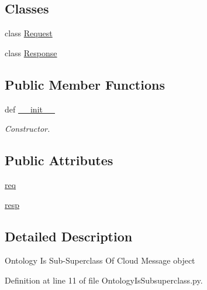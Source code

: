 \subsection*{Classes}
\begin{DoxyCompactItemize}
\item 
class \hyperlink{classRappCloud_1_1CloudMsgs_1_1OntologyIsSubsuperclass_1_1OntologyIsSubsuperclass_1_1Request}{Request}
\item 
class \hyperlink{classRappCloud_1_1CloudMsgs_1_1OntologyIsSubsuperclass_1_1OntologyIsSubsuperclass_1_1Response}{Response}
\end{DoxyCompactItemize}
\subsection*{Public Member Functions}
\begin{DoxyCompactItemize}
\item 
def \hyperlink{classRappCloud_1_1CloudMsgs_1_1OntologyIsSubsuperclass_1_1OntologyIsSubsuperclass_a8ce28cb561c85abac5df189f4b043601}{\-\_\-\-\_\-init\-\_\-\-\_\-}
\begin{DoxyCompactList}\small\item\em Constructor. \end{DoxyCompactList}\end{DoxyCompactItemize}
\subsection*{Public Attributes}
\begin{DoxyCompactItemize}
\item 
\hyperlink{classRappCloud_1_1CloudMsgs_1_1OntologyIsSubsuperclass_1_1OntologyIsSubsuperclass_a3ba977d885c6e4a0320e3f95450f883f}{req}
\item 
\hyperlink{classRappCloud_1_1CloudMsgs_1_1OntologyIsSubsuperclass_1_1OntologyIsSubsuperclass_a72853b4ae58fb0757d71039f75ca49d5}{resp}
\end{DoxyCompactItemize}


\subsection{Detailed Description}
\begin{DoxyVerb}Ontology Is Sub-Superclass Of Cloud Message object\end{DoxyVerb}
 

Definition at line 11 of file Ontology\-Is\-Subsuperclass.\-py.



